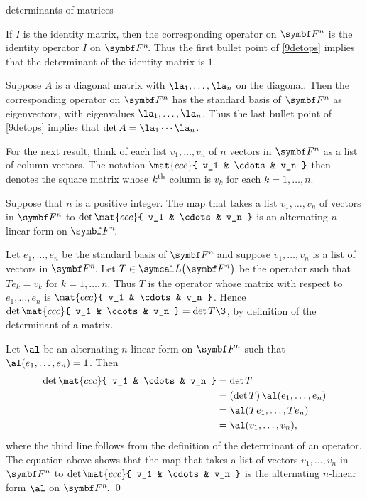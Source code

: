 \begin{example}{determinants of matrices}
\begin{Itemize}
\item
If $I$ is the  identity matrix, then the corresponding operator on $\F n$ is the identity operator $I$ on $\FF n$. Thus the first bullet point of \ref{9detops} implies that the determinant of the identity matrix is $1$.

\item
Suppose $A$ is a diagonal matrix with $\la_1, \ldots, \la_n$ on the diagonal. Then the corresponding operator on $\F n$ has the standard basis of $\F n$ as eigenvectors, with eigenvalues $\la_1, \ldots, \la_n$. Thus the last bullet point of \ref{9detops} implies that $\det A = \la_1 \cdots \la_n$.
\end{Itemize}
\vspace{-10bp}
\end{example}

For the next result, think of each list $v_1, \ldots, v_n$ of $n$ vectors in $\F n$ as a list of  column vectors. The notation
$\mat{ccc}{ v_1 & \cdots & v_n }$ then denotes the  square matrix whose $k^{\text{{th}}}$ column is $v_k$ for each $k = 1, \ldots, n$.

{Suppose that $n$ is a positive integer. The map that takes a list $v_1, \ldots, v_n$ of vectors in $\F n$ to $\det \mat{ccc}{ v_1 & \cdots & v_n }$ is an alternating $n$-linear form on $\FF n$.}

\proof
Let $e_1, \ldots, e_n$ be the standard basis of $\FF n$ and suppose $v_1, \ldots, v_n$ is a list of vectors in $\FF n$.
Let $T \in \L\paren[\big]{ \F n }$ be the operator such that $Te_k = v_k$ for $k = 1, \ldots, n$. Thus $T$ is the operator whose matrix with respect to $e_1, \ldots, e_n$ is $\mat{ccc}{ v_1 & \cdots & v_n }$. Hence
$\det \mat{ccc}{ v_1 & \cdots & v_n } = \det T\3$, by definition of the determinant of a matrix.

Let $\al$ be an alternating $n$-linear form on $\F n$ such that $\al(e_1, \ldots, e_n) = 1$. Then
\begin{align*}
\det \mat{ccc}{ v_1 & \cdots & v_n } &= \det T \\
&= (\det T) \, \al(e_1, \ldots, e_n) \\
&=\al(Te_1, \ldots, Te_n) \\
&= \al(v_1, \ldots, v_n),
\end{align*}
where the third line follows from the definition of the determinant of an operator. The equation above shows that the map that takes a list of vectors $v_1, \ldots, v_n$ in $\F n$ to $\det \mat{ccc}{ v_1 & \cdots & v_n }$ is the alternating $n$-linear form $\al$ on $\FF n$.
\qed

